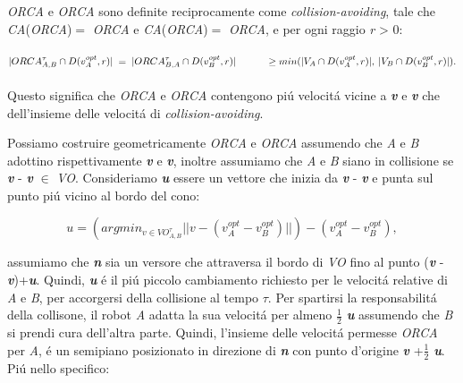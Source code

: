 \begin{definizione} 
\noindent

 \textit{ORCA}\ap{$\tau$}  e \textit{ORCA}\ap{$\tau$} sono definite reciprocamente come \textit{collision-avoiding}, tale che \textit{CA}\ap{$\tau$}(\textit{ORCA}\ap{$\tau$})$=$ \textit{ORCA}\ap{$\tau$} e \textit{CA}\ap{$\tau$}(\textit{ORCA}\ap{$\tau$})$=$ \textit{ORCA}\ap{$\tau$}, e per ogni raggio \textit{r} > 0:
\\
\\$|{ORCA}^{\tau}_{A,B} \cap D(v^{opt}_A,r)|\;=\;|{ORCA}^{\tau}_{B,A} \cap D(v^{opt}_B,r)| \\\; \;\;\;\;\;\;\;\;\;\:\geq \; \\ min(|V_A \cap D(v^{opt}_A,r)|,\:|V_B \cap D(v^{opt}_B,r)|).$
\\
\\
Questo significa che \textit{ORCA}\ap{$\tau$}  e \textit{ORCA}\ap{$\tau$} contengono pi\'u velocit\'a vicine a {\bfseries\textit{v}} e {\bfseries\textit{v}} che dell'insieme delle velocit\'a di \textit{collision-avoiding}.
\end{definizione} 

Possiamo costruire geometricamente \textit{ORCA}\ap{$\tau$}  e \textit{ORCA}\ap{$\tau$} assumendo che \textit{A} e \textit{B} adottino rispettivamente {\bfseries\textit{v}} e {\bfseries\textit{v}},  inoltre assumiamo che \textit{A} e \textit{B} siano in collisione se {\bfseries\textit{v}} - {\bfseries\textit{v}} $\in$ \textit{VO}\ap{$\tau$}.
Consideriamo {\bfseries\textit{u}} essere un vettore che inizia da {\bfseries\textit{v}} - {\bfseries\textit{v}} e punta sul punto pi\'u vicino al bordo del cono:

\begin{equation}
u=(argmin_{v \in VO^{\tau}_{A,B}}||v-(v^{opt}_{A} - v^{opt}_{B})||) - (v^{opt}_{A} - v^{opt}_{B}),
\end{equation}

assumiamo che {\bfseries\textit{n}} sia un versore che attraversa il bordo di \textit{VO}\ap{$\tau$} fino al punto ({\bfseries\textit{v}} - {\bfseries\textit{v}})+{\bfseries\textit{u}}. Quindi, {\bfseries\textit{u}} \'e il pi\'u piccolo cambiamento richiesto per le velocit\'a relative di \textit{A} e \textit{B}, per accorgersi della collisione al tempo $\tau$. Per spartirsi la responsabilit\'a della collisone, il robot \textit{A} adatta la sua velocit\'a per almeno $\frac{1}{2}$ {\bfseries\textit{u}} assumendo che \textit{B} si prendi cura dell'altra parte. Quindi, l'insieme delle velocit\'a permesse \textit{ORCA}\ap{$\tau$} per \textit{A}, \'e un semipiano posizionato in direzione di {\bfseries\textit{n}} con punto d'origine {\bfseries\textit{v}}
 +$\frac{1}{2}$ {\bfseries\textit{u}}. Pi\'u nello specifico:
 
